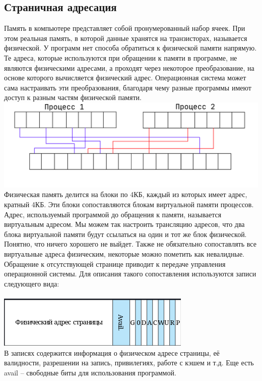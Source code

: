 \documentclass[12pt, a4paper]{article}
\begin{document}
	\subsection{Страничная адресация}
	Память в компьютере представляет собой пронумерованный набор ячеек. При этом реальная память, в которой данные хранятся на транзисторах, называется физической. У программ нет способа обратиться к физической памяти напрямую. Те адреса, которые используются при обращении к памяти в программе, не являются физическими адресами, а проходят через некоторое преобразование, на основе которого вычисляется физический адрес. Операционная система может сама настраивать эти преобразования, благодаря чему разные программы имеют доступ к разным частям физической памяти.\\
	\includegraphics[scale=0.5, ]{virtual_memory1.png}
	\\Физическая память делится на блоки по 4КБ, каждый из которых имеет адрес, кратный 4КБ. Эти блоки сопоставляются блокам виртуальной памяти процессов. Адрес, используемый программой до обращения к памяти, называется виртуальным адресом. Мы можем так настроить трансляцию адресов, что два блока виртуальной памяти будут ссылаться на один и тот же блок физической. Понятно, что ничего хорошего не выйдет. Также не обязательно сопоставлять все виртуальные адреса физическим, некоторые можно пометить как невалидные. Обращение к отсутствующей странице приводит к передаче управления операционной системы. Для описания такого сопоставления используются записи следующего вида:\\\\
	\includegraphics{virtual_memory_flags.png}\\
	В записях содержится информация о физическом адресе страницы, её валидности, разрешении на запись, привилегиях, работе с кэшем и т.д. Еще есть avail -- свободные биты для использования программой.
\end{document}
